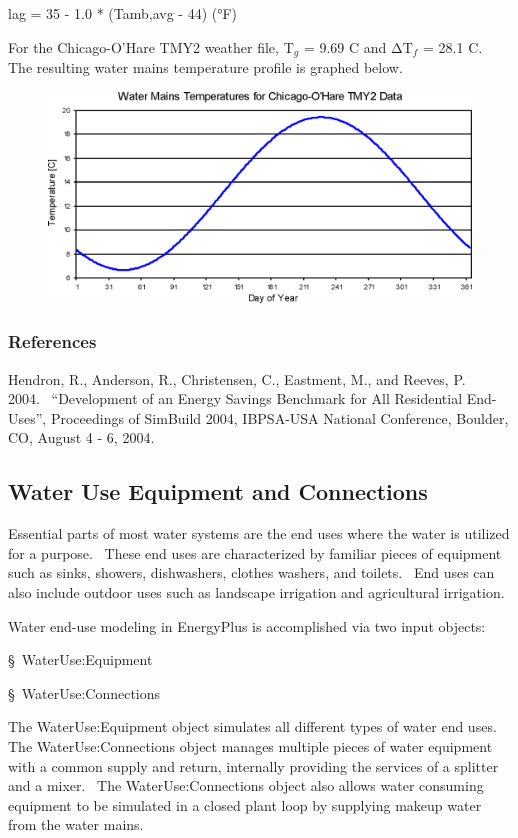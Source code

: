 lag = 35 - 1.0 * (Tamb,avg - 44) (°F)

For the Chicago-O'Hare TMY2 weather file, T\(_{g}\) = 9.69 C and ΔT\(_{f}\) = 28.1 C.~ The resulting water mains temperature profile is graphed below.

\begin{figure}[htbp]
\centering
\includegraphics{media/image6936.png}
\caption{}
\end{figure}

\subsubsection{References}\label{references-052}

Hendron, R., Anderson, R., Christensen, C., Eastment, M., and Reeves, P.~ 2004.~ ``Development of an Energy Savings Benchmark for All Residential End-Uses'', Proceedings of SimBuild 2004, IBPSA-USA National Conference, Boulder, CO, August 4 - 6, 2004.

\subsection{Water Use Equipment and Connections}\label{water-use-equipment-and-connections}

Essential parts of most water systems are the end uses where the water is utilized for a purpose.~ These end uses are characterized by familiar pieces of equipment such as sinks, showers, dishwashers, clothes washers, and toilets.~ End uses can also include outdoor uses such as landscape irrigation and agricultural irrigation.

Water end-use modeling in EnergyPlus is accomplished via two input objects:

§~WaterUse:Equipment

§~WaterUse:Connections

The WaterUse:Equipment object simulates all different types of water end uses.~ The WaterUse:Connections object manages multiple pieces of water equipment with a common supply and return, internally providing the services of a splitter and a mixer.~ The WaterUse:Connections object also allows water consuming equipment to be simulated in a closed plant loop by supplying makeup water from the water mains.

